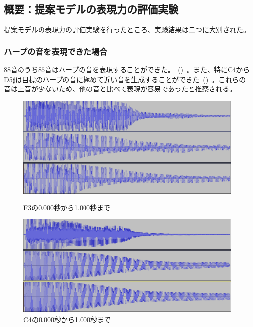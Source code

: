 \subsection{概要：提案モデルの表現力の評価実験}

提案モデルの表現力の評価実験を行ったところ、実験結果は二つに大別された。

\subsubsection{ハープの音を表現できた場合}

88音のうち86音はハープの音を表現することができた。~()~。また、特にC4からD5$\sharp$は目標のハープの音に極めて近い音を生成することができた~()~。これらの音は上音が少ないため、他の音と比べて表現が容易であったと推察される。

\begin{figure}[b]
\centering
\begin{minipage}{0.48\columnwidth}
\centering
\includegraphics[width=0.9\columnwidth]{figure/88_88/f3.png}
\caption[F3の音波]{F3の0.000秒から1.000秒まで}
\label{fig:88_88_good1}
\end{minipage}
\begin{minipage}{0.48\columnwidth}
\centering
\includegraphics[width=0.9\columnwidth]{figure/88_88/c4.png}
\caption[C4の音波]{C4の0.000秒から1.000秒まで}
\label{fig:88_88_good2}
\end{minipage}
\end{figure}

